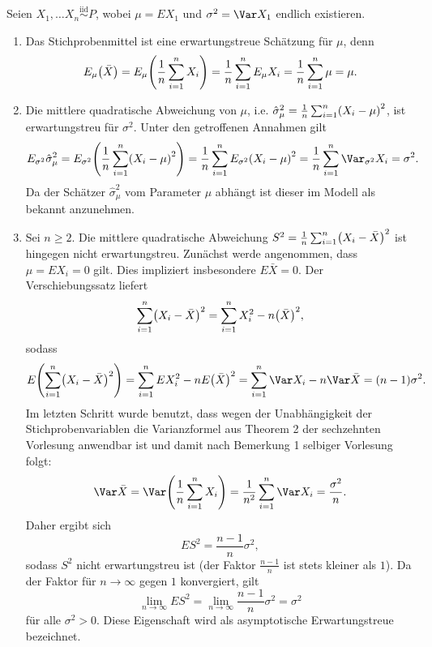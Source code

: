 \documentclass{lecture}
\begin{document}
    \begin{example}
        Seien \(X_1, \ldots X_n \stackrel{\text{iid}}{\sim} P\), wobei \(\mu = EX_1\) und \(\sigma^2 = \Var X_1\) endlich existieren.
        \begin{enumerate}
            \item Das Stichprobenmittel ist eine erwartungstreue Schätzung für \(\mu\), denn
            \[
                E_\mu\parentheses*{\bar{X}} = E_\mu\parentheses*{\frac{1}{n}\sum_{i = 1}^n X_i} = \frac{1}{n}\sum_{i = 1}^n E_\mu X_i = \frac{1}{n}\sum_{i = 1}^n \mu = \mu.
            \]
            \item Die mittlere quadratische Abweichung von \(\mu\), i.e. \(\hat{\sigma}_\mu^2 = \frac{1}{n}\sum_{i = 1}^n \parentheses*{X_i - \mu}^2\), ist erwartungstreu für \(\sigma^2\). Unter den getroffenen Annahmen gilt
            \[
                E_{\sigma^2}\hat{\sigma}_\mu^2 = E_{\sigma^2}\parentheses*{\frac{1}{n}\sum_{i = 1}^n \parentheses*{X_i - \mu}^2} = \frac{1}{n}\sum_{i = 1}^n E_{\sigma^2}\parentheses*{X_i - \mu}^2 = \frac{1}{n}\sum_{i = 1}^n \Var_{\sigma^2}X_i = \sigma^2.
            \]
            Da der Schätzer \(\hat{\sigma}_\mu^2\) vom Parameter \(\mu\) abhängt ist dieser im Modell als bekannt anzunehmen.
            \item Sei \(n \ge 2\).
            Die mittlere quadratische Abweichung \(S^2 = \frac{1}{n}\sum_{i = 1}^n \parentheses*{X_i - \bar{X}}^2\) ist hingegen nicht erwartungstreu.
            Zunächst werde angenommen, dass \(\mu = EX_i = 0\) gilt.
            Dies impliziert insbesondere \(E\bar{X} = 0\).
            Der Verschiebungssatz liefert
            \[
                \sum_{i = 1}^n \parentheses*{X_i - \bar{X}}^2 = \sum_{i = 1}^n X_i^2 - n\parentheses*{\bar{X}}^2,
            \]
            sodass
            \[
                E\parentheses*{\sum_{i = 1}^n \parentheses*{X_i - \bar{X}}^2} = \sum_{i = 1}^n EX_i^2 - nE\parentheses*{\bar{X}}^2 = \sum_{i = 1}^n \Var X_i - n\Var\bar{X} = \parentheses*{n - 1}\sigma^2.
            \]
            Im letzten Schritt wurde benutzt, dass wegen der Unabhängigkeit der Stichprobenvariablen die Varianzformel aus Theorem 2 der sechzehnten Vorlesung anwendbar ist und damit nach Bemerkung 1 selbiger Vorlesung folgt:
            \[
                \Var\bar{X} = \Var\parentheses*{\frac{1}{n}\sum_{i = 1}^n X_i} = \frac{1}{n^2}\sum_{i = 1}^n \Var X_i = \frac{\sigma^2}{n}.
            \]
            Daher ergibt sich
            \[
                ES^2 = \frac{n - 1}{n}\sigma^2,
            \]
            sodass \(S^2\) nicht erwartungstreu ist (der Faktor \(\frac{n - 1}{n}\) ist stets kleiner als \(1\)).
            Da der Faktor für \(n \to \infty\) gegen \(1\) konvergiert, gilt
            \[
                \lim_{n \to \infty}ES^2 = \lim_{n \to \infty}\frac{n - 1}{n}\sigma^2 = \sigma^2
            \]
            für alle \(\sigma^2 > 0\).
            Diese Eigenschaft wird als asymptotische Erwartungstreue bezeichnet.


\end{enumerate}
\end{example}
\end{document}
